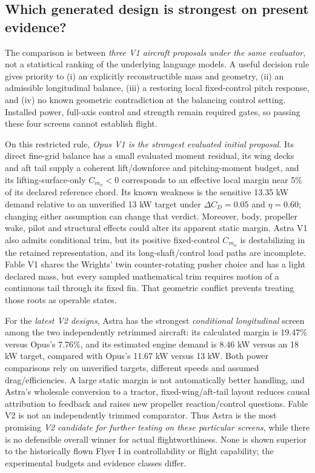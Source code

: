 \documentclass[11pt,a4paper]{article}
\begin{document}
\subsection{Which generated design is strongest on present evidence?}
The comparison is between \emph{three V1 aircraft proposals under the same evaluator}, not a statistical ranking of the underlying language models. A useful decision rule gives priority to (i) an explicitly reconstructible mass and geometry, (ii) an admissible longitudinal balance, (iii) a restoring local fixed-control pitch response, and (iv) no known geometric contradiction at the balancing control setting. Installed power, full-axis control and strength remain required gates, so passing these four screens cannot establish flight.

On this restricted rule, \emph{Opus V1 is the strongest evaluated initial proposal}. Its direct fine-grid balance has a small evaluated moment residual, its wing decks and aft tail supply a coherent lift/downforce and pitching-moment budget, and its lifting-surface-only $C_{m_\alpha}<0$ corresponds to an effective local margin near 5\% of its declared reference chord. Its known weakness is the sensitive 13.35 kW demand relative to an unverified 13 kW target under $\Delta C_D=0.05$ and $\eta=0.60$; changing either assumption can change that verdict. Moreover, body, propeller wake, pilot and structural effects could alter its apparent static margin. Astra V1 also admits conditional trim, but its positive fixed-control $C_{m_\alpha}$ is destabilizing in the retained representation, and its long-shaft/control load paths are incomplete. Fable V1 shares the Wrights' twin counter-rotating pusher choice and has a light declared mass, but every sampled mathematical trim requires motion of a continuous tail through its fixed fin. That geometric conflict prevents treating those roots as operable states.

For the \emph{latest V2 designs}, Astra has the strongest \emph{conditional longitudinal} screen among the two independently retrimmed aircraft: its calculated margin is 19.47\% versus Opus's 7.76\%, and its estimated engine demand is 8.46 kW versus an 18 kW target, compared with Opus's 11.67 kW versus 13 kW. Both power comparisons rely on unverified targets, different speeds and assumed drag/efficiencies. A large static margin is not automatically better handling, and Astra's wholesale conversion to a tractor, fixed-wing/aft-tail layout reduces causal attribution to feedback and raises new propeller reaction/control questions. Fable V2 is not an independently trimmed comparator. Thus Astra is the most promising \emph{V2 candidate for further testing on these particular screens}, while there is no defensible overall winner for actual flightworthiness. None is shown superior to the historically flown Flyer I in controllability or flight capability; the experimental budgets and evidence classes differ.
\end{document}
